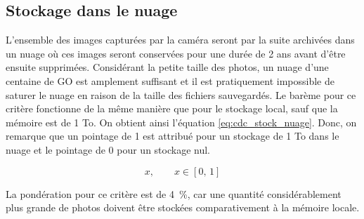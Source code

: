 

\subsection{Stockage dans le nuage}
\label{s:cdc_stock_nuage}

L’ensemble des images capturées par la caméra seront par la suite archivées dans un nuage où ces images seront conservées pour une durée de 2 ans avant d’être ensuite supprimées. Considérant la petite taille des photos, un nuage d’une centaine de GO est amplement suffisant et il est pratiquement impossible de saturer le nuage en raison de la taille des fichiers sauvegardés. Le barème pour ce critère fonctionne de la même manière que pour le stockage local, sauf que la mémoire est de 1 To. On obtient ainsi l’équation \ref{eq:cdc_stock_nuage}. Donc, on remarque que un pointage de 1 est attribué pour un stockage de 1 To dans le nuage et le pointage de 0 pour un stockage nul.

\begin{equation} \label{eq:cdc_stock_nuage}
x, \qquad x \in [0,\,1]
\end{equation}


La pondération pour ce critère est de 4~\%, car une quantité considérablement plus grande de photos doivent être stockées comparativement à la mémoire locale.
